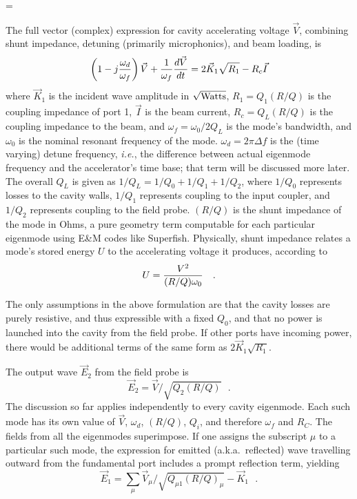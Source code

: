 \magnification=
\parindent=0pt
\baselineskip=13.5pt
\parskip=6pt

%

The full vector (complex) expression for cavity accelerating voltage $\vec V$,
combining shunt impedance, detuning (primarily microphonics), and beam loading,
is
$$\left(1-j{\omega_d\over \omega_f}\right)\vec V +
 {1\over\omega_f}{d\vec V\over dt} =
 2\vec K_1\sqrt{R_1} - R_c\vec I $$
where $\vec K_1$ is the incident wave amplitude in $\sqrt{\rm Watts}$,
$R_1=Q_1(R/Q)$ is the coupling impedance of port 1,
$\vec I$ is the beam current, $R_c=Q_L(R/Q)$ is the coupling impedance
to the beam, and $\omega_f=\omega_0/2Q_L$ is the mode's bandwidth,
and $\omega_0$ is the nominal resonant frequency of the mode.
$\omega_d=2\pi\Delta f$ is the (time varying) detune frequency,
{\it i.e.}, the difference between actual eigenmode frequency and the accelerator's time base;
that term will be discussed more later.
The overall $Q_L$ is given as $1/Q_L=1/Q_0+1/Q_1+1/Q_2$, where $1/Q_0$
represents losses to the cavity walls, $1/Q_1$ represents coupling
to the input coupler, and $1/Q_2$ represents coupling to the field probe.
$(R/Q)$ is the shunt impedance of the mode in Ohms, a pure geometry term
computable for each particular eigenmode using E\&M codes like Superfish.
Physically, shunt impedance relates a mode's stored energy $U$ to the
accelerating voltage it produces, according to
$$U = {V^2 \over (R/Q)\omega_0}~~~.$$

The only assumptions in the above formulation are that the cavity losses
are purely resistive, and thus expressible with a fixed $Q_0$, and that
no power is launched into the cavity from the field probe.  If other
ports have incoming power, there would be additional terms of the same
form as $2\vec K_1\sqrt{R_1}$.

The output wave $\vec E_2$ from the field probe is
$$\vec E_2=\vec V / \sqrt{Q_2(R/Q)}~~~.$$
The discussion so far applies independently to every cavity eigenmode.
Each such mode has its own value of $\vec V$, $\omega_d$, $(R/Q)$, $Q_i$,
and therefore $\omega_f$ and $R_C$.  The fields from all the eigenmodes
superimpose.  If one assigns the subscript $\mu$
to a particular such mode, the expression for emitted (a.k.a.~reflected)
wave travelling outward from the fundamental port includes a prompt reflection
term, yielding
$$\vec E_1=\sum_\mu \vec V_\mu / \sqrt{Q_{\mu 1}(R/Q)_\mu} - \vec K_1~~~.$$

